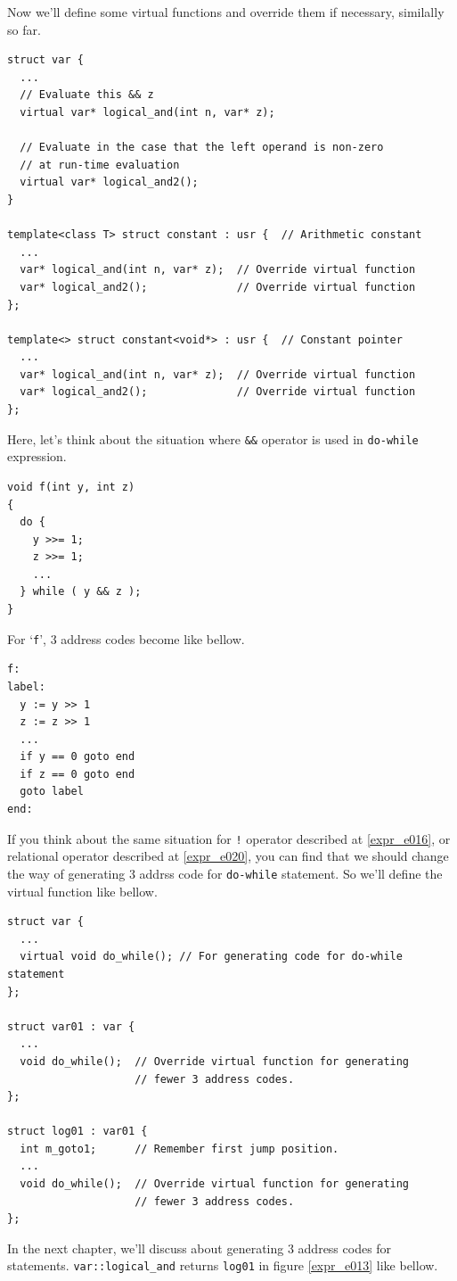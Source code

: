 Now we'll define some virtual functions and override them if 
necessary, similally so far.
\begin{verbatim}
struct var {
  ...
  // Evaluate this && z
  virtual var* logical_and(int n, var* z);

  // Evaluate in the case that the left operand is non-zero
  // at run-time evaluation
  virtual var* logical_and2();
}

template<class T> struct constant : usr {  // Arithmetic constant
  ...
  var* logical_and(int n, var* z);  // Override virtual function
  var* logical_and2();              // Override virtual function
};

template<> struct constant<void*> : usr {  // Constant pointer
  ...
  var* logical_and(int n, var* z);  // Override virtual function
  var* logical_and2();              // Override virtual function
};
\end{verbatim}
Here, let's think about the situation where {\tt{\&\&}} operator
is used in {\tt{do-while}} expression.
\begin{verbatim}
void f(int y, int z)
{
  do {
    y >>= 1;
    z >>= 1;
    ...
  } while ( y && z );
}
\end{verbatim}
For `{\tt{f}}', 3 address codes become like bellow.
\begin{verbatim}
f:
label:
  y := y >> 1
  z := z >> 1
  ...
  if y == 0 goto end
  if z == 0 goto end
  goto label
end:
\end{verbatim}
If you think about the same situation for {\tt{!}} operator 
described at \ref{expr_e016}, or relational operator
described at \ref{expr_e020}, you can find that
we should change the way of generating 3 addrss code
for {\tt{do-while}} statement. So we'll define the virtual
function like bellow.
\begin{verbatim}
struct var {
  ...
  virtual void do_while(); // For generating code for do-while statement
};

struct var01 : var {
  ...
  void do_while();  // Override virtual function for generating
                    // fewer 3 address codes.
};

struct log01 : var01 {
  int m_goto1;      // Remember first jump position.
  ...
  void do_while();  // Override virtual function for generating
                    // fewer 3 address codes.
};
\end{verbatim}
In the next chapter, we'll discuss about generating 3 address codes
for statements. {\tt{var::logical\_and}} returns {\tt{log01}} in
figure \ref{expr_e013} like bellow.
